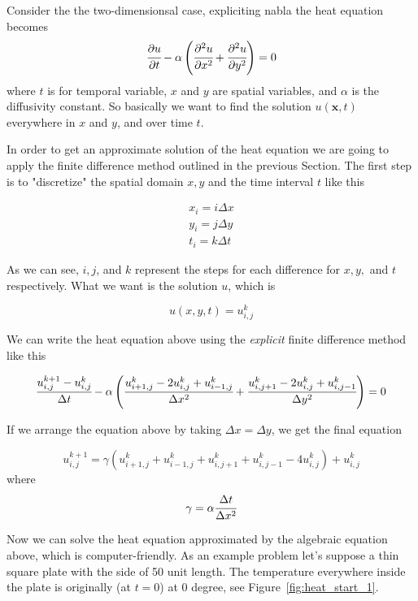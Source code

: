 Consider the the two-dimensionsal case, expliciting nabla the heat equation becomes
\begin{equation}
\cfrac{\partial u}{\partial t} - \alpha\left(\cfrac{\partial^2 u}{\partial x^2}+\cfrac{\partial^2 u}{\partial y^2}\right)= 0
\end{equation}
\noindent
where $t$ is for temporal variable, $x$ and $y$ are spatial variables, and $\alpha$ is the diffusivity constant. So basically we want to find the solution $u(\mathbf{x}, t)$ everywhere in $x$ and $y$, and over time $t$.

In order to get an approximate solution of the heat equation we are going to apply the finite difference method outlined in the previous Section. The first step is to "discretize" the spatial domain $x, y$ and the time interval $t$ like this

\begin{gather}
x_i = i\Delta x \\
y_i = j\Delta y \\
t_i = k\Delta t 
\end{gather}

As we can see, $i, j$, and $k$ represent the steps for each difference for $x, y,$ and $t$ respectively. What we want is the solution $u$, which is

\begin{equation}
u(x, y, t) = u_{i,j}^k
\end{equation}

We can write the heat equation above using the \emph{explicit} finite difference method like this

\begin{equation}
\cfrac{u_{i,j}^{k+1}-u_{i,j}^k}{\Delta t} - \alpha\left(\cfrac{u_{i+1,j}^{k}-2u_{i,j}^{k}+u_{i-1,j}^{k}}{\Delta x^2}+\cfrac{u_{i,j+1}^{k}-2u_{i,j}^{k}+u_{i,j-1}^{k}}{\Delta y^2}\right)=0
\end{equation}

If we arrange the equation above by taking $\Delta x = \Delta y$, we get the final equation

\begin{equation}
u_{i,j}^{k+1} = \gamma \left(u_{i+1,j}^{k}+u_{i-1,j}^{k}+u_{i,j+1}^{k}+u_{i,j-1}^{k}-4u_{i,j}^{k}\right)+u_{i,j}^{k}
\end{equation}
\noindent 
where
\begin{equation}
\gamma = \alpha\cfrac{\Delta t}{\Delta x^2}
\end{equation}

Now we can solve the heat equation approximated by the algebraic equation above, which is computer-friendly. As an example problem let’s suppose a thin square plate with the side of 50 unit length. The temperature everywhere inside the plate is originally (at $t = 0$) at 0 degree, see Figure~\ref{fig:heat_start_1}.

